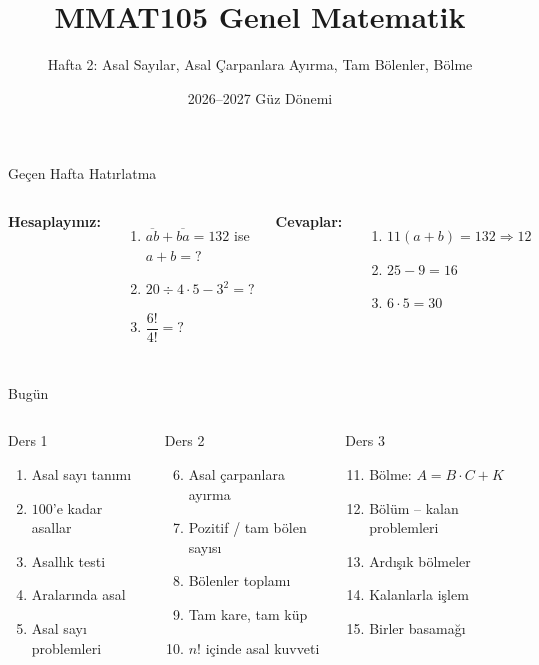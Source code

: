 \documentclass[aspectratio=169,11pt]{beamer}
\title[MMAT105 -- Hafta 2]{MMAT105 Genel Matematik}
\subtitle{Hafta 2: Asal Sayılar, Asal Çarpanlara Ayırma, Tam Bölenler, Bölme}
\author{}
\date{2026--2027 Güz Dönemi}
\newcommand{\ab}[1]{\overline{#1}}
\begin{document}
\begin{frame}
\titlepage
\end{frame}


\begin{frame}{Geçen Hafta Hatırlatma}
\begin{columns}[t]
\textbf{Hesaplayınız:}
\begin{enumerate}
\item \(\ab{ab}+\ab{ba}=132\) ise \(a+b=?\)
\item \(20\div 4\cdot 5-3^2=?\)
\item \(\dfrac{6!}{4!}=?\)
\end{enumerate}
\pause
\textbf{Cevaplar:}
\begin{enumerate}
\item \(11(a+b)=132\Rightarrow 12\)
\item \(25-9=16\)
\item \(6\cdot 5=30\)
\end{enumerate}
\end{columns}
\end{frame}

\begin{frame}{Bugün}
\begin{columns}[t]
\begin{block}{Ders 1}
\begin{enumerate}
\item Asal sayı tanımı
\item \(100\)'e kadar asallar
\item Asallık testi
\item Aralarında asal
\item Asal sayı problemleri
\end{enumerate}
\end{block}
\begin{block}{Ders 2}
\begin{enumerate}\setcounter{enumi}{5}
\item Asal çarpanlara ayırma
\item Pozitif / tam bölen sayısı
\item Bölenler toplamı
\item Tam kare, tam küp
\item \(n!\) içinde asal kuvveti
\end{enumerate}
\end{block}
\begin{block}{Ders 3}
\begin{enumerate}\setcounter{enumi}{10}
\item Bölme: \(A=B\cdot C+K\)
\item Bölüm -- kalan problemleri
\item Ardışık bölmeler
\item Kalanlarla işlem
\item Birler basamağı
\end{enumerate}
\end{block}
\end{columns}
\end{frame}
\end{document}
